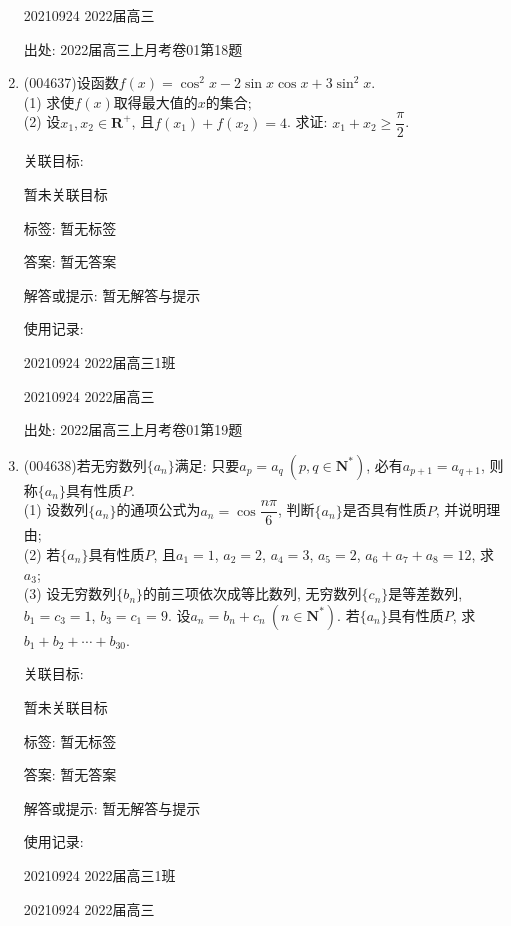 \documentclass[10pt,a4paper]{article}
\begin{document}
\begin{enumerate}[1.]
20210924	2022届高三		


出处: 2022届高三上月考卷01第18题
\item { (004637)}设函数$f(x)=\cos^2x-2\sin x\cos x+3\sin^2x$.\\
(1) 求使$f(x)$取得最大值的$x$的集合;\\
(2) 设$x_1,x_2\in \mathbf{R}^+$, 且$f(x_1)+f(x_2)=4$. 求证: $x_1+x_2\ge \dfrac{\pi}2$.


关联目标:

暂未关联目标



标签: 暂无标签

答案: 暂无答案

解答或提示: 暂无解答与提示

使用记录:

20210924	2022届高三1班		

20210924	2022届高三		


出处: 2022届高三上月考卷01第19题
\item { (004638)}若无穷数列$\{a_n\}$满足: 只要$a_p=a_q \ (p,q\in \mathbf{N}^*)$, 必有$a_{p+1}=a_{q+1}$, 则称$\{a_n\}$具有性质$P$.\\
(1) 设数列$\{a_n\}$的通项公式为$a_n=\cos \dfrac{n\pi}{6}$, 判断$\{a_n\}$是否具有性质$P$, 并说明理由;\\
(2) 若$\{a_n\}$具有性质$P$, 且$a_1=1$, $a_2=2$, $a_4=3$, $a_5=2$, $a_6+a_7+a_8=12$, 求$a_3$;\\
(3) 设无穷数列$\{b_n\}$的前三项依次成等比数列, 无穷数列$\{c_n\}$是等差数列, $b_1=c_3=1$, $b_3=c_1=9$. 设$a_n=b_n+c_n\ (n\in \mathbf{N}^*)$. 若$\{a_n\}$具有性质$P$, 求$b_1+b_2+\cdots+b_{30}$.


关联目标:

暂未关联目标



标签: 暂无标签

答案: 暂无答案

解答或提示: 暂无解答与提示

使用记录:

20210924	2022届高三1班			

20210924	2022届高三			



\end{enumerate}
\end{document}
